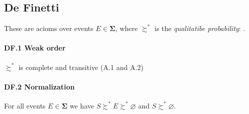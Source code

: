 \documentclass[14pt]{extarticle}
\begin{document}
%
%
%
%

\subsection{De Finetti}
These are acioms over events $E \in \bm \Sigma$,
where $\succsim^*$ is the \textit{qualitatibe probability}:
.

\paragraph{DF.1 Weak order}
$\succsim^*$ is complete and transitive (A.1 and A.2)

\paragraph{DF.2 Normalization}
For all events $E \in \bm \Sigma$
we have $S \succsim^* E \succsim^* \varnothing$
and $S \succsim^* \varnothing$.
\end{document}
